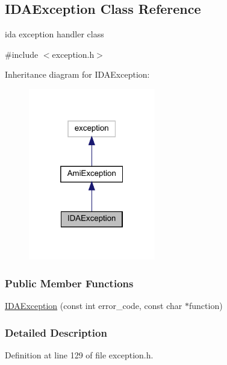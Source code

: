 \hypertarget{classamici_1_1_i_d_a_exception}{}\subsection{I\+D\+A\+Exception Class Reference}
\label{classamici_1_1_i_d_a_exception}


ida exception handler class  




{\ttfamily \#include $<$exception.\+h$>$}



Inheritance diagram for I\+D\+A\+Exception\+:
\nopagebreak
\begin{figure}[H]
\begin{center}
\leavevmode
\includegraphics[width=157pt]{classamici_1_1_i_d_a_exception__inherit__graph}
\end{center}
\end{figure}
\subsubsection*{Public Member Functions}
\begin{DoxyCompactItemize}
\item 
\mbox{\hyperlink{classamici_1_1_i_d_a_exception_ac01f061945cc83140822b1e6c69761fb}{I\+D\+A\+Exception}} (const int error\+\_\+code, const char $\ast$function)
\end{DoxyCompactItemize}


\subsubsection{Detailed Description}


Definition at line 129 of file exception.\+h.



